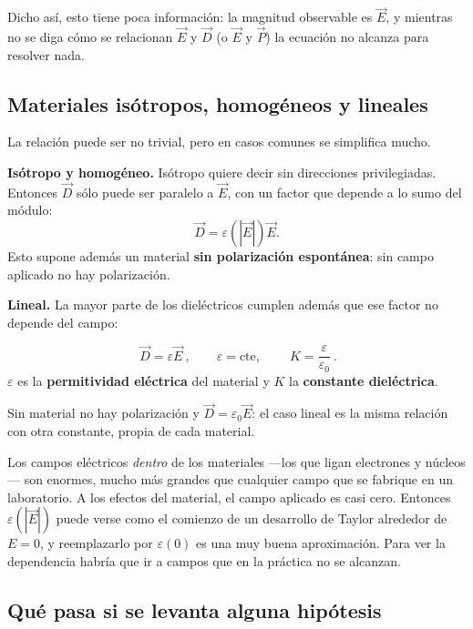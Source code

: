 \documentclass[12pt,a4paper]{article}
\begin{document}
Dicho así, esto tiene poca información: la magnitud observable es $\vec E$, y
mientras no se diga cómo se relacionan $\vec E$ y $\vec D$ (o $\vec E$ y
$\vec P$) la ecuación no alcanza para resolver nada.

\subsection{Materiales isótropos, homogéneos y lineales}

La relación puede ser no trivial, pero en casos comunes se simplifica mucho.

\textbf{Isótropo y homogéneo.} Isótropo quiere decir sin direcciones
privilegiadas. Entonces $\vec D$ sólo puede ser paralelo a $\vec E$, con un factor
que depende a lo sumo del módulo:
\[
\vec D = \varepsilon\!\left(|\vec E|\right) \vec E .
\]
Esto supone además un material \textbf{sin polarización espontánea}: sin campo
aplicado no hay polarización.

\textbf{Lineal.} La mayor parte de los dieléctricos cumplen además que ese factor
no depende del campo:

\begin{keybox}
\[
\boxed{\ \vec D = \varepsilon \vec E\ },
\qquad \varepsilon = \text{cte},
\qquad
\boxed{\ K = \frac{\varepsilon}{\varepsilon_0}\ }.
\]
$\varepsilon$ es la \textbf{permitividad eléctrica} del material y $K$ la
\textbf{constante dieléctrica}.
\end{keybox}

Sin material no hay polarización y $\vec D = \varepsilon_0\vec E$: el caso lineal
es la misma relación con otra constante, propia de cada material.

\begin{notebox}
Los campos eléctricos \emph{dentro} de los materiales ---los que ligan electrones
y núcleos--- son enormes, mucho más grandes que cualquier campo que se fabrique en
un laboratorio. A los efectos del material, el campo aplicado es casi cero.
Entonces $\varepsilon(|\vec E|)$ puede verse como el comienzo de un desarrollo de
Taylor alrededor de $E=0$, y reemplazarlo por $\varepsilon(0)$ es una muy buena
aproximación. Para ver la dependencia habría que ir a campos que en la práctica
no se alcanzan.
\end{notebox}

\subsection{Qué pasa si se levanta alguna hipótesis}
\end{document}

